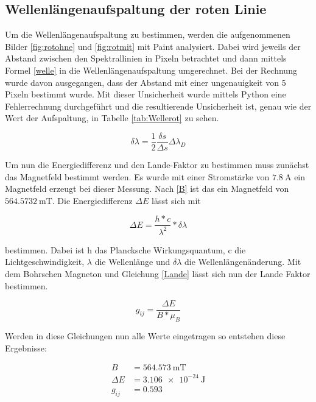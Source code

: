 \subsection{Wellenlängenaufspaltung der roten Linie}

\noindent Um die Wellenlängenaufspaltung zu bestimmen, werden die aufgenommenen Bilder \ref{fig:rotohne} und \ref{fig:rotmit} mit Paint analysiert. Dabei wird jeweils der Abstand zwischen den Spektrallinien in Pixeln betrachtet und dann mittels Formel \ref{welle} in die Wellenlängenaufspaltung umgerechnet. Bei der Rechnung wurde davon ausgegangen, dass der Abstand mit einer ungenauigkeit von 5 Pixeln bestimmt wurde. Mit dieser Unsicherheit wurde mittels Python eine Fehlerrechnung durchgeführt und die resultierende Unsicherheit ist, genau wie der Wert der Aufspaltung, in Tabelle \ref{tab:Wellerot} zu sehen.

\begin{equation}
    \delta \lambda = \frac{1}{2} \frac{\delta s}{\Delta s} \Delta \lambda_D \label{welle}
\end{equation}

\noindent Um nun die Energiedifferenz und den Lande-Faktor zu bestimmen muss zunächst das Magnetfeld bestimmt werden. Es wurde mit einer Stromstärke von $ \SI{7.8}{\ampere} $ ein Magnetfeld erzeugt bei dieser Messung. Nach \ref{B} ist das ein Magnetfeld von $\SI{564.5732}{\milli\tesla}$.
Die Energiedifferenz $ \Delta E $ lässt sich mit 

\begin{equation} \label{dE}
    \Delta E = \frac{h * c}{\lambda^2} * \delta \lambda
\end{equation}

\noindent bestimmen. Dabei ist h das Plancksche Wirkungsquantum, c die Lichtgeschwindigkeit, $ \lambda $ die Wellenlänge und $ \delta \lambda $ die Wellenlängenänderung. Mit dem Bohrschen Magneton und Gleichung \ref{Lande} lässt sich nun der Lande Faktor bestimmen. 

\begin{equation} \label{Lande}
    g_{ij} = \frac{\Delta E}{B * \mu_B} 
\end{equation}

\noindent Werden in diese Gleichungen nun alle Werte eingetragen so entstehen diese Ergebnisse:

\begin{align*}
    B &= \SI{564.573}{\milli\tesla} \\
    \Delta E &= \SI{3.106e-24}{\joule} \\
    g_{ij} &= 0.593 
\end{align*}

